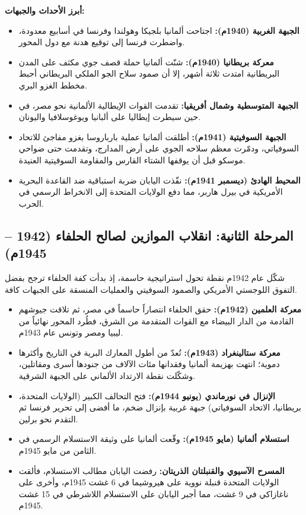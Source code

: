 \documentclass[12pt, a4paper]{article}
\begin{document}
\begin{keybox}
\textbf{أبرز الأحداث والجبهات:}
\begin{itemize}[leftmargin=*, itemsep=3pt]
  \item \textbf{الجبهة الغربية (1940م):}
        اجتاحت ألمانيا بلجيكا وهولندا وفرنسا في أسابيع معدودة،
        واضطرت فرنسا إلى توقيع هدنة مع دول المحور.
  \item \textbf{معركة بريطانيا (1940م):}
        شنّت ألمانيا حملة قصف جوي مكثف على المدن البريطانية امتدت ثلاثة أشهر،
        إلا أن صمود سلاح الجو الملكي البريطاني أحبط مخطط الغزو البري.
  \item \textbf{الجبهة المتوسطية وشمال أفريقيا:}
        تقدمت القوات الإيطالية الألمانية نحو مصر، في حين سيطرت إيطاليا على
        ألبانيا ويوغوسلافيا واليونان.
  \item \textbf{الجبهة السوفيتية (1941م):}
        أطلقت ألمانيا عملية بارباروسا بغزو مفاجئ للاتحاد السوفياتي، ودمّرت
        معظم سلاحه الجوي على أرض المدارج، وتقدمت حتى ضواحي موسكو قبل أن
        يوقفها الشتاء القارس والمقاومة السوفيتية العنيدة.
  \item \textbf{المحيط الهادئ (ديسمبر 1941م):}
        نفّذت اليابان ضربة استباقية ضد القاعدة البحرية الأمريكية في بيرل هاربر،
        مما دفع الولايات المتحدة إلى الانخراط الرسمي في الحرب.
\end{itemize}
\end{keybox}

\subsection{المرحلة الثانية: انقلاب الموازين لصالح الحلفاء (1942 – 1945م)}

شكّل عام 1942م نقطة تحول استراتيجية حاسمة، إذ بدأت كفة الحلفاء ترجح بفضل
التفوق اللوجستي الأمريكي والصمود السوفيتي والعمليات المنسقة على الجبهات كافة.

\begin{itemize}[leftmargin=*, itemsep=4pt]
  \item \textbf{معركة العلمين (1942م):}
        حقق الحلفاء انتصاراً حاسماً في مصر، ثم تلاقت جيوشهم القادمة
        من الدار البيضاء مع القوات المتقدمة من الشرق، فطُرد المحور
        نهائياً من ليبيا ومصر وتونس عام 1943م.
  \item \textbf{معركة ستالينغراد (1943م):}
        تُعدّ من أطول المعارك البرية في التاريخ وأكثرها دموية؛ انتهت بهزيمة
        ألمانيا وفقدانها مئات الآلاف من جنودها أسرى ومقاتلين،
        وشكّلت نقطة الارتداد الألماني على الجبهة الشرقية.
  \item \textbf{الإنزال في نورماندي (يونيو 1944م):}
        فتح التحالف الكبير (الولايات المتحدة، بريطانيا، الاتحاد السوفياتي) جبهة
        غربية بإنزال ضخم، ما أفضى إلى تحرير فرنسا ثم التقدم نحو برلين.
  \item \textbf{استسلام ألمانيا (مايو 1945م):}
        وقّعت ألمانيا على وثيقة الاستسلام الرسمي في الثامن من مايو 1945م.
  \item \textbf{المسرح الآسيوي والقنبلتان الذريتان:}
        رفضت اليابان مطالب الاستسلام، فألقت الولايات المتحدة قنبلة نووية
        على هيروشيما في 6 غشت 1945م، وأخرى على ناغازاكي في 9 غشت،
        مما أجبر اليابان على الاستسلام اللاشرطي في 15 غشت 1945م.
\end{itemize}
\end{document}
